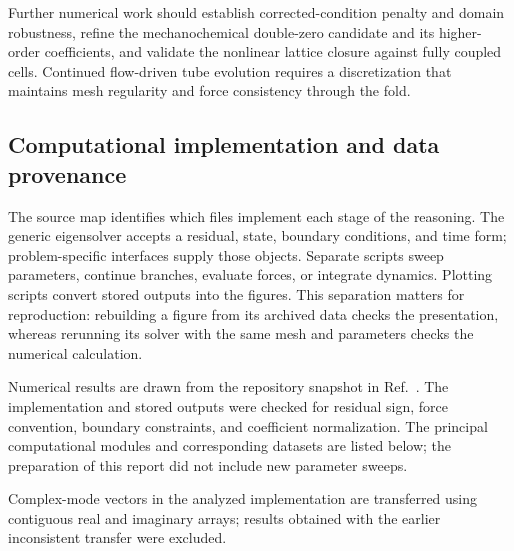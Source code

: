 Further numerical work should establish corrected-condition penalty and domain robustness, refine the mechanochemical double-zero candidate and its higher-order coefficients, and validate the nonlinear lattice closure against fully coupled cells. Continued flow-driven tube evolution requires a discretization that maintains mesh regularity and force consistency through the fold.

\subsection{Computational implementation and data provenance}


The source map identifies which files implement each stage of the reasoning. The generic eigensolver accepts a residual, state, boundary conditions, and time form; problem-specific interfaces supply those objects. Separate scripts sweep parameters, continue branches, evaluate forces, or integrate dynamics. Plotting scripts convert stored outputs into the figures. This separation matters for reproduction: rebuilding a figure from its archived data checks the presentation, whereas rerunning its solver with the same mesh and parameters checks the numerical calculation.


Numerical results are drawn from the repository snapshot in Ref.~\cite{repo}. The implementation and stored outputs were checked for residual sign, force convention, boundary constraints, and coefficient normalization. The principal computational modules and corresponding datasets are listed below; the preparation of this report did not include new parameter sweeps.

Complex-mode vectors in the analyzed implementation are transferred using contiguous real and imaginary arrays; results obtained with the earlier inconsistent transfer were excluded.


